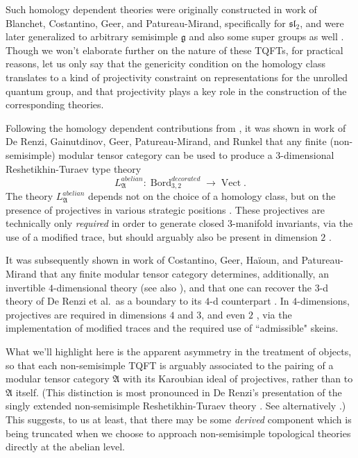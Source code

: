 \documentclass[reqno]{amsart}
\theoremstyle{definition}
\newcommand{\mfk}[1]{\mathfrak{#1}}
\newcommand{\opn}[1]{\operatorname{#1}}
\DeclareMathOperator{\Bord}{Bord}
\renewcommand{\1}{\mathbf{1}}
\begin{document}
Such homology dependent theories were originally constructed in work of Blanchet, Costantino, Geer, and Patureau-Mirand, specifically for $\mfk{sl}_2$, and were later generalized to arbitrary semisimple $\mfk{g}$ and also some super groups as well \cite{derenzigeermirand20,garnergeeryoung25,geeryoung25}.  Though we won't elaborate further on the nature of these TQFTs, for practical reasons, let us only say that the genericity condition on the homology class translates to a kind of projectivity constraint on representations for the unrolled quantum group, and that projectivity plays a key role in the construction of the corresponding theories.
\par

Following the homology dependent contributions from \cite{blanchetetal16,derenzigeermirand20}, it was shown in work of De Renzi, Gainutdinov, Geer, Patureau-Mirand, and Runkel that any finite (non-semisimple) modular tensor category can be used to produce a $3$-dimensional Reshetikhin-Turaev type theory
\[
L^{abelian}_\mfk{A}:\Bord^{decorated}_{3,2}\to \opn{Vect}.
\]
The theory $L^{abelian}_\mfk{A}$ depends not on the choice of a homology class, but on the presence of projectives in various strategic positions \cite{derenzietal23}.  These projectives are technically only \emph{required} in order to generate closed $3$-manifold invariants, via the use of a modified trace, but should arguably also be present in dimension $2$ \cite{derenzi21,geerpatureumirand}.
\par

It was subsequently shown in work of Costantino, Geer, Ha\"ioun, and Patureau-Mirand \cite{costantinoetalII} that any finite modular tensor category determines, additionally, an invertible $4$-dimensional theory (see also \cite{brochieretal21,beliakovaderenzi24}), and that one can recover the $3$-d theory of De Renzi et al.\ as a boundary to its $4$-d counterpart \cite{haioun}. In $4$-dimensions, projectives are required in dimensions $4$ and $3$, and even $2$ \cite{brownhaioun}, via the implementation of modified traces and the required use of ``admissible" skeins.
\par

What we'll highlight here is the apparent asymmetry in the treatment of objects, so that each non-semisimple TQFT is arguably associated to the pairing of a modular tensor category $\mfk{A}$ with its Karoubian ideal of projectives, rather than to $\mfk{A}$ itself. (This distinction is most pronounced in De Renzi's presentation of the singly extended non-semisimple Reshetikhin-Turaev theory \cite{derenzi21}. See alternatively \cite{lagiotis}.)  This suggests, to us at least, that there may be some \emph{derived} component which is being truncated when we choose to approach non-semisimple topological theories directly at the abelian level.
\end{document}
